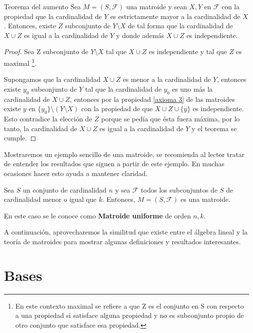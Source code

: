 \begin{teo}{Teorema del aumento} \label{augmentation}
Sea $M=(S,\mathcal{F})$ una matroide y sean $X,Y$ en $\mathcal{F}$ con la propiedad que la cardinalidad de $Y$ es estrictamente mayor a la cardinalidad de $X$. Entonces, existe $Z$ subconjunto de $Y \setminus X$ de tal forma que la cardinalidad de $X \cup Z$ es igual a la cardinalidad de $Y$ y donde además $X \cup Z$ es independiente. 
\end{teo}
\begin{proof}
Sea Z subconjunto de $Y \setminus X$ tal que $X \cup Z$ es independiente y tal que $Z$ es maximal \footnote{En este contexto maximal se refiere a que Z es el conjunto en S con respecto a una propiedad si satisface alguna propiedad y no es subconjunto propio de otro conjunto que satisface esa propiedad.}. 
 
Supongamos que la cardinalidad $X \cup Z$ es menor a la cardinalidad de $Y$, entonces existe $y_0$ subconjunto de $Y$ tal que la cardinalidad de $y_0$ es uno más la cardinalidad de $X \cup Z$, entonces por la propiedad \ref{axioma 3} de las matroides existe $y$ en $\{y_0\} \setminus (Y \setminus X)$ con la propiedad de que $X \cup Z \cup \{ y\}$ es independiente. Esto contradice la elección de $Z$ porque se pedía que ésta fuera máxima, por lo tanto, la cardinalidad de $X \cup Z$ es igual a la cardinalidad de $Y$ y el teorema se cumple. 
\end{proof}

Mostraremos un ejemplo sencillo de una matroide, se recomienda al lector tratar de entender los resultados que siguen a partir de este ejemplo. En muchas ocasiones hacer esto ayuda a mantener claridad.

\begin{eje}
Sea $S$ un conjunto de cardinalidad $n$ y sea $\mathcal{F}$ todos los subconjuntos de $S$ de cardinalidad menor o igual que $k$. Entonces, $M=(S,\mathcal{F})$ es una matroide. 

En este caso se le conoce como  \textbf{Matroide uniforme} de orden $n,k$.
\fin
\end{eje}


A continuación, aprovecharemos la similitud que existe entre el álgebra lineal y la teoría de matroides para mostrar algunas definiciones y resultados interesantes. 

\section{Bases}

